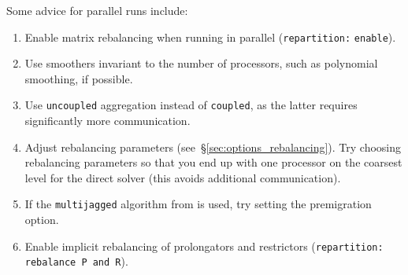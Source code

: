 Some advice for parallel runs include:
\begin{enumerate}
  \item
    Enable matrix rebalancing when running in parallel (\texttt{repartition:}
    \texttt{enable}).

  \item
    Use smoothers invariant to the number of processors, such as
    polynomial smoothing, if possible.

  \item
    Use \texttt{uncoupled} aggregation instead of \texttt{coupled}, as the latter
    requires significantly more communication.

  \item
    Adjust rebalancing parameters (see~\S\ref{sec:options_rebalancing}). Try
    choosing rebalancing parameters so that you end up with one processor on the
    coarsest level for the direct solver (this avoids additional communication).

  \item
    If the \texttt{multijagged} algorithm from  is used, try setting the premigration option.

  \item
    Enable implicit rebalancing of prolongators and restrictors
    (\texttt{repartition: rebalance P and R}).
\end{enumerate}

